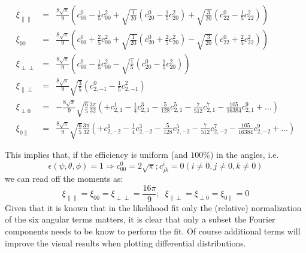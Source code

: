 \documentclass[a4paper,9pt,twoside]{article}
\begin{document}
\begin{eqnarray}
    \xi_{\parallel\parallel} &=& \frac{8 \sqrt{\pi}}{9} \left( c^0_{00}-\frac{1}{5}c^2_{00}+\sqrt{\frac{1}{20}}\left(c^0_{20}-\frac{1}{5}c^2_{20}\right)+\sqrt{\frac{3}{20}}\left(c^0_{22}-\frac{1}{5}c^2_{22}\right)  \right)  \\
    \xi_{00}                 &=& \frac{8 \sqrt{\pi}}{9} \left( c^0_{00}+\frac{2}{5}c^2_{00}+\sqrt{\frac{1}{20}}(c^0_{20}+\frac{2}{5}c^2_{20})-\sqrt{\frac{3}{20}}(c^0_{22}+\frac{2}{5}c^2_{22}) \right) \\
    \xi_{\perp\perp}         &=& \frac{8 \sqrt{\pi}}{9} \left( c^0_{00}-\frac{1}{5}c^2_{00} - \sqrt{\frac{1}{5}}\left(c^0_{20}-\frac{1}{5}c^2_{20}\right)\right)\\
    \xi_{\parallel\perp}     &=& \frac{8 \sqrt{\pi}}{9} \sqrt{\frac{3}{5}}\left(c^0_{2,-1}-\frac{1}{5}c^2_{2,-1}\right)  \\
    \xi_{\perp 0}            &=& -\frac{8 \sqrt{\pi}}{9} \sqrt{\frac{6}{5}}\frac{3\pi}{32}\left( +c^1_{2,1} -\frac{1}{4}c^3_{2,1}- \frac{5}{128}c^5_{2,1} -\frac{7}{512}c^7_{2,1} - \frac{105}{16384}c^9_{2,1}+... \right) \\
    \xi_{0\parallel}         &=& \frac{8 \sqrt{\pi}}{9} \sqrt{\frac{6}{5}}\frac{3\pi}{32}\left( +c^1_{2,-2}-\frac{1}{4}c^3_{2,-2}-\frac{5}{128}c^5_{2,-2}-\frac{7}{512}c^7_{2,-2} - \frac{105}{16384}c^9_{2,-2}+... \right) 
\end{eqnarray}

This implies that, if the efficiency is uniform (and $100\%$) in the angles, i.e.
\begin{equation}
   \epsilon(\psi,\theta,\phi) = 1 \Rightarrow c^0_{00} = 2\sqrt{\pi} ; c^{i}_{jk} = 0 (i\neq 0, j\neq 0, k \neq 0)
\end{equation}
we can read off the moments as:
\begin{equation}
    \xi_{\parallel\parallel}= \xi_{00}= \xi_{\perp\perp}  = \frac{16\pi}{9};\;\; \xi_{\parallel\perp} =\xi_{\perp 0} = \xi_{0\parallel} = 0
\end{equation}
Given that it is known that  in the likelihood fit only the (relative) normalization of the six angular
terms matters, it is clear that only a subset the Fourier components needs to be know to
perform the fit. Of course additional terms will improve the visual results when plotting 
differential distributions.
\end{document}
